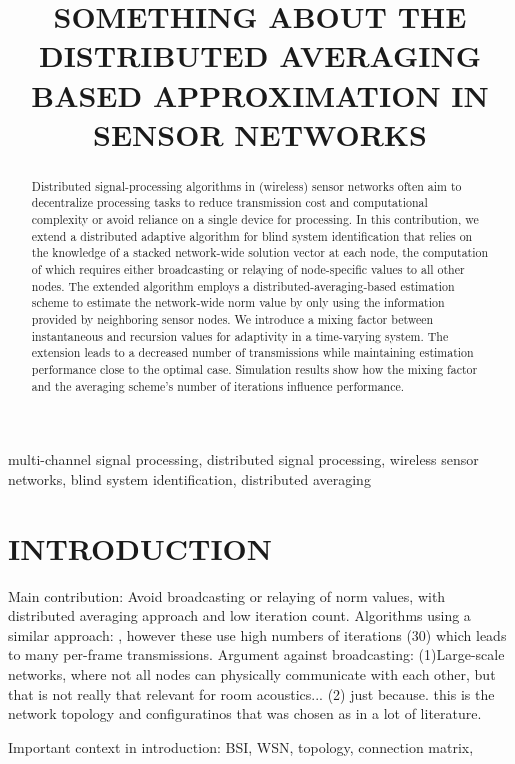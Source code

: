 \documentclass{article}
\title{SOMETHING ABOUT THE DISTRIBUTED AVERAGING BASED APPROXIMATION IN SENSOR NETWORKS}
\begin{document}
%
\maketitle
%
\begin{abstract}
  Distributed signal-processing algorithms in (wireless) sensor networks often aim to decentralize processing tasks to reduce transmission cost and computational complexity or avoid reliance on a single device for processing. In this contribution, we extend a distributed adaptive algorithm for blind system identification that relies on the knowledge of a stacked network-wide solution vector at each node, the computation of which requires either broadcasting or relaying of node-specific values to all other nodes. The extended algorithm employs a distributed-averaging-based estimation scheme to estimate the network-wide norm value by only using the information provided by neighboring sensor nodes. We introduce a mixing factor between instantaneous and recursion values for adaptivity in a time-varying system. The extension leads to a decreased number of transmissions while maintaining estimation performance close to the optimal case. Simulation results show how the mixing factor and the averaging scheme's number of iterations influence performance.
\end{abstract}
%
\begin{keywords}
multi-channel signal processing, distributed signal processing, wireless sensor networks, blind system identification, distributed averaging
\end{keywords}
%
\section{INTRODUCTION}
\label{sec:intro}

Main contribution: Avoid broadcasting or relaying of norm values, with distributed averaging approach and low iteration count.
Algorithms using a similar approach: \cite{yuDistributedBlindSystem2014, liuDistributedBlindIdentification2016,liuDistributedRecursiveBlind2017}, however these use high numbers of iterations (30) which leads to many per-frame transmissions.
Argument against broadcasting: (1)Large-scale networks, where not all nodes can physically communicate with each other, but that is not really that relevant for room acoustics... (2) just because. this is the network topology and configuratinos that was chosen as in a lot of literature.

Important context in introduction: BSI, WSN, topology, connection matrix, 
\end{document}
